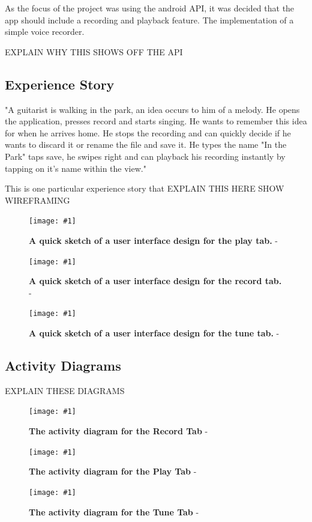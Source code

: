 \documentclass[conference]{acmsiggraph}
\newcommand{\figuremacroW}[4]{
	\begin{figure}[H] %
		\centering
		\texttt{[image: \#1]}
		\caption[#2]{\textbf{#2} - #3}
		\label{fig:#1}
	\end{figure}
}
\begin{document}

As the focus of the project was using the android API, it was decided that the app should include a recording and playback feature. The implementation of a simple voice recorder. %

EXPLAIN WHY THIS SHOWS OFF THE API


\subsection{Experience Story}

"A guitarist is walking in the park, an idea occurs to him of a melody. He opens the application, presses record and starts singing. He wants to remember this idea for when he arrives home. He stops the recording and can quickly decide if he wants to discard it or rename the file and save it. He types the name "In the Park" taps save, he swipes right and can playback his recording instantly by tapping on it's name within the view." 

This is one particular experience story that EXPLAIN THIS HERE
SHOW WIREFRAMING

\figuremacroW
{playSketch}
{A quick sketch of a user interface design for the play tab.}
{}
{1.0}

\figuremacroW
{recordSketch}
{A quick sketch of a user interface design for the record tab.}
{}
{1.0}

\figuremacroW
{tuneSketch}
{A quick sketch of a user interface design for the tune tab.}
{}
{1.0}

\subsection{Activity Diagrams}

EXPLAIN THESE DIAGRAMS

\figuremacroW
{RecordTab}
{The activity diagram for the Record Tab}
{}
{1.0}

\figuremacroW
{PlayTab}
{The activity diagram for the Play Tab}
{}
{1.0}

\figuremacroW
{TuneTab}
{The activity diagram for the Tune Tab}
{}
{1.0}



 
\end{document}
